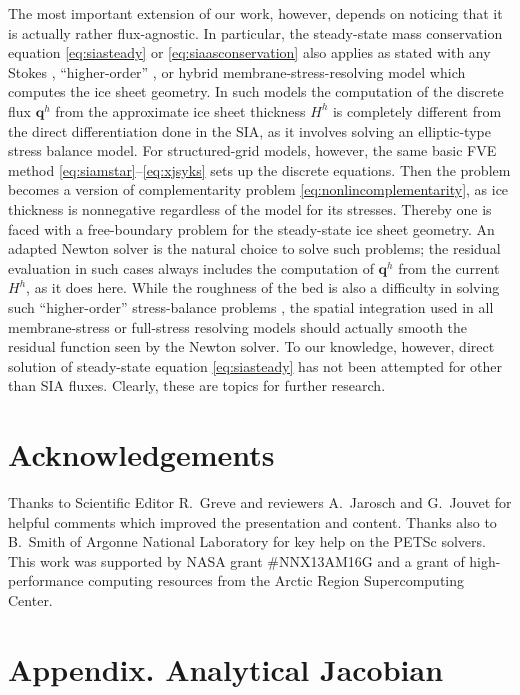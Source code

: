 \documentclass[review,letterpaper]{igs}
\newcommand\bq{\mathbf{q}}
\begin{document}
The most important extension of our work, however, depends on noticing that it is actually rather flux-agnostic.  In particular, the steady-state mass conservation equation \eqref{eq:siasteady} or \eqref{eq:siaasconservation} also applies as stated with any Stokes \citep{GreveBlatter2009}, ``higher-order'' \citep{Pattynetal2008}, or hybrid membrane-stress-resolving \citep{Winkelmannetal2011} model which computes the ice sheet geometry.  In such models the computation of the discrete flux $\bq^h$ from the approximate ice sheet thickness $H^h$ is completely different from the direct differentiation done in the SIA, as it involves solving an elliptic-type stress balance model.  For structured-grid models, however, the same basic FVE method \eqref{eq:siamstar}--\eqref{eq:xjsyks} sets up the discrete equations.  Then the problem becomes a version of complementarity problem \eqref{eq:nonlincomplementarity}, as ice thickness is nonnegative regardless of the model for its stresses.  Thereby one is faced with a free-boundary problem for the steady-state ice sheet geometry.  An adapted Newton solver is the natural choice to solve such problems; the residual evaluation in such cases always includes the computation of $\bq^h$ from the current $H^h$, as it does here.  While the roughness of the bed is also a difficulty in solving such ``higher-order'' stress-balance problems \citep{BrownSmithAhmadia2013}, the spatial integration used in all membrane-stress or full-stress resolving models should actually smooth the residual function seen by the Newton solver.  To our knowledge, however, direct solution of steady-state equation \eqref{eq:siasteady} has not been attempted for other than SIA fluxes.  Clearly, these are topics for further research.


\section*{Acknowledgements}
Thanks to Scientific Editor R.~Greve and reviewers A.~Jarosch and G.~Jouvet for helpful comments which improved the presentation and content.  Thanks also to B.~Smith of Argonne National Laboratory for key help on the PETSc solvers.  This work was supported by NASA grant \#NNX13AM16G and a grant of high-performance computing resources from the Arctic Region Supercomputing Center.





\appendix
\section{Appendix. Analytical Jacobian}
\end{document}
